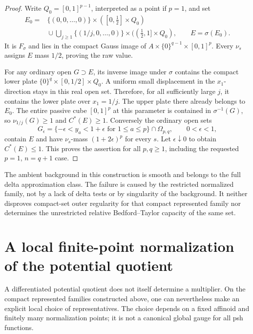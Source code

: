 \documentclass[11pt,a4paper]{article}
\numberwithin{equation}{section}
\theoremstyle{definition}
\theoremstyle{remark}
\begin{document}
\begin{proof}
Write $Q_0=[0,1]^{p-1}$, interpreted as a point if $p=1$, and set
\[
 \begin{split}
 E_0={}&\{(0,0,\ldots,0)\}\times([0,\tfrac12]\times Q_0)\\
 &{}\cup\bigcup_{j\ge1}
       \{(1/j,0,\ldots,0)\}\times((\tfrac12,1]\times Q_0),
 \qquad E=\sigma(E_0).
 \end{split}
\]
It is $F_\sigma$ and lies in the compact Gauss image of
$A\times\{0\}^{q-1}\times[0,1]^p$. Every $\nu_s$ assigns
$E$ mass $1/2$, proving the raw value.

For any ordinary open $G\supset E$, its inverse image under
$\sigma$ contains the compact lower plate
$\{0\}^q\times[0,1/2]\times Q_0$. A uniform small displacement
in the $x_1$-direction stays in this real open set. Therefore, for
all sufficiently large $j$, it contains the lower plate over
$x_1=1/j$. The upper plate there already belongs to $E_0$.
The entire passive cube $[0,1]^p$ at this parameter is contained
in $\sigma^{-1}(G)$, so $\nu_{1/j}(G)\ge1$ and $C^*(E)\ge1$.
Conversely the ordinary open sets
\[
        G_\epsilon=\{-\epsilon<y_a<1+\epsilon
                          \text{ for }1\le a\le p\}
                                  \cap\Omega_{p,q},
       \qquad 0<\epsilon<1,
\]
contain $E$ and have $\nu_s$-mass $(1+2\epsilon)^p$ for every
$s$. Let $\epsilon\downarrow0$ to obtain $C^*(E)\le1$.
This proves the assertion for all $p,q\ge1$, including the requested
$p=1$, $n=q+1$ case.
\end{proof}

The ambient background in this construction is smooth and belongs
to the full delta approximation class. The failure is caused by
the restricted normalized family, not by a lack of delta tests or
by singularity of the background. It neither disproves compact-set
outer regularity for that compact represented family nor determines
the unrestricted relative Bedford--Taylor capacity of the same set.



\section{A local finite-point normalization of the potential quotient}
\label{sec:r6-local-ph-gauge}

A differentiated potential quotient does not itself determine a
multiplier. On the compact represented families constructed above,
one can nevertheless make an explicit local choice of representatives.
The choice depends on a fixed affinoid and finitely many normalization
points; it is not a canonical global gauge for all psh functions.
\end{document}
